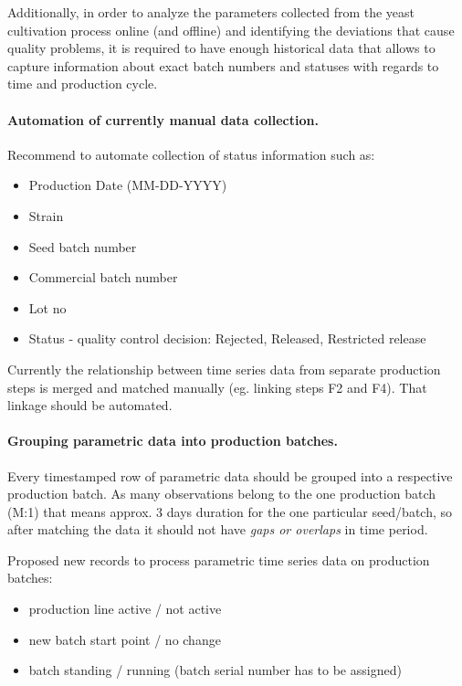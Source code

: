 Additionally, in order to analyze the parameters collected from the yeast cultivation process online (and offline) and identifying the deviations that cause quality problems, it is required to have enough historical data that allows to capture information about exact batch numbers and statuses with regards to time and production cycle. 

\paragraph{Automation of currently manual data collection.}
Recommend to automate collection of status information such as:
\begin{itemize}
    \item Production Date (MM-DD-YYYY)
    \item Strain
    \item Seed batch number
    \item Commercial batch number
    \item Lot no
    \item Status - quality control decision: Rejected, Released, Restricted release
\end{itemize}

Currently the relationship between time series data from separate production steps is merged and matched manually (eg. linking steps F2 and F4). That linkage should be automated.

\paragraph{Grouping parametric data into production batches.}
Every time\-stamped row of parametric data should be grouped into a respective production batch. As many observations belong to the one production batch (M:1) that means approx. 3 days duration for the one particular seed/batch, so after matching the data it should not have \emph{gaps or overlaps} in time period.  

Proposed new records to process parametric time series data on production batches: 
\begin{itemize}
    \item production line active / not active
    \item new batch start point / no change
    \item batch standing / running (batch serial number has to be assigned) 
\end{itemize}

